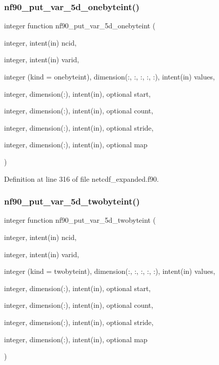 \subsubsection{\texorpdfstring{nf90\+\_\+put\+\_\+var\+\_\+5d\+\_\+onebyteint()}{nf90\_put\_var\_5d\_onebyteint()}}
{\footnotesize\ttfamily integer function nf90\+\_\+put\+\_\+var\+\_\+5d\+\_\+onebyteint (\begin{DoxyParamCaption}\item[{integer, intent(in)}]{ncid,  }\item[{integer, intent(in)}]{varid,  }\item[{integer (kind = onebyteint), dimension(\+:, \+:, \+:, \+:, \+:), intent(in)}]{values,  }\item[{integer, dimension(\+:), intent(in), optional}]{start,  }\item[{integer, dimension(\+:), intent(in), optional}]{count,  }\item[{integer, dimension(\+:), intent(in), optional}]{stride,  }\item[{integer, dimension(\+:), intent(in), optional}]{map }\end{DoxyParamCaption})}



Definition at line 316 of file netcdf\+\_\+expanded.\+f90.

\mbox{\label{netcdf__expanded_8f90_ac2a3ff05c9fb72ef179f4095859401ac}} 
\subsubsection{\texorpdfstring{nf90\+\_\+put\+\_\+var\+\_\+5d\+\_\+twobyteint()}{nf90\_put\_var\_5d\_twobyteint()}}
{\footnotesize\ttfamily integer function nf90\+\_\+put\+\_\+var\+\_\+5d\+\_\+twobyteint (\begin{DoxyParamCaption}\item[{integer, intent(in)}]{ncid,  }\item[{integer, intent(in)}]{varid,  }\item[{integer (kind = twobyteint), dimension(\+:, \+:, \+:, \+:, \+:), intent(in)}]{values,  }\item[{integer, dimension(\+:), intent(in), optional}]{start,  }\item[{integer, dimension(\+:), intent(in), optional}]{count,  }\item[{integer, dimension(\+:), intent(in), optional}]{stride,  }\item[{integer, dimension(\+:), intent(in), optional}]{map }\end{DoxyParamCaption})}



